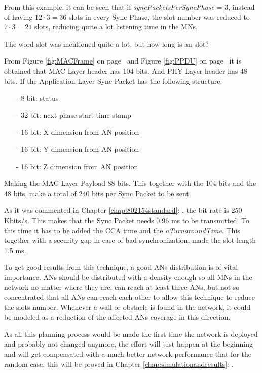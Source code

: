 From this example, it can be seen that if \textit{syncPacketsPerSyncPhase} = 3, instead of having $12 \cdot 3 = 36$ slots in every Sync Phase, the slot 
number was reduced to $7 \cdot 3 = 21$ slots, reducing quite a lot listening time in the \acp{MN}.

The word slot was mentioned quite a lot, but how long is an slot?

From Figure \ref{fig:MACFrame} on page~\pageref{fig:MACFrame} and Figure \ref{fig:PPDU} on page~\pageref{fig:PPDU} it is obtained that \ac{MAC}
Layer header has 104 bits. And \ac{PHY} Layer header has 48 bits. If the Application Layer Sync Packet has the following structure:
\begin{itemize}
 \item[-] 8 bit: status
 \item[-] 32 bit: next phase start time-stamp
 \item[-] 16 bit: X dimension from \ac{AN} position
 \item[-] 16 bit: Y dimension from \ac{AN} position
 \item[-] 16 bit: Z dimension from \ac{AN} position
\end{itemize}
Making the \ac{MAC} Layer Payload 88 bits. This together with the 104 bits and the 48 bits, make a total of 240 bits per Sync Packet to be sent.

As it was commented in Chapter \ref{chap:802154standard}: , the bit rate is 250 Kbits/s. This makes that the Sync
Packet needs 0.96 ms to be transmitted. To this time it has to be added the \ac{CCA} time and the \textit{aTurnaroundTime}. This together with
a security gap in case of bad synchronization, made the slot length 1.5 ms.

To get good results from this technique, a good \acp{AN} distribution is of vital importance. \acp{AN} should be distributed with a density enough
so all \acp{MN} in the network no matter where they are, can reach at least three \acp{AN}, but not so concentrated that all \acp{AN} can
reach each other to allow this technique to reduce the slots number. Whenever a wall or obstacle is found in the network, it could be modeled as
a reduction of the affected \acp{AN} coverage in this direction. 

As all this planning process would be made the first time the network is deployed and probably not changed anymore, the effort will just happen 
at the beginning and will get compensated with a much better network performance that for the random case, this will be proved in Chapter 
\ref{chap:simulationandresults}: .